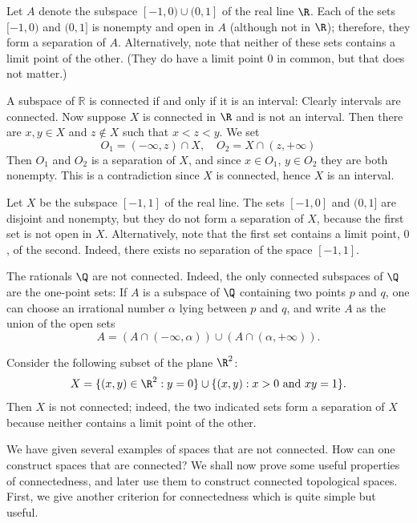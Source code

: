 \begin{example}
Let $A$ denote the subspace $[-1,0)\cup(0,1]$ of the real line $\R$. Each of the sets $[-1,0)$ and $(0,1]$ is nonempty and open in $A$ (although not in $\R$); therefore, they form a separation of $A$. Alternatively, note that neither of these sets contains a limit point of the other. (They do have a limit point $0$ in common, but that does not matter.)
\end{example}
\begin{example}
A subspace of $\mathbb{R}$ is connected if and only if it is an interval: Clearly intervals are connected. Now suppose $X$ is connected in $\R$ and is not an interval. Then there are $x,y\in X$ and $z\notin X$ such that $x<z<y$. We set
\[O_1=(-\infty,z)\cap X,\quad O_2=X\cap(z,+\infty)\]
Then $O_1$ and $O_2$ is a separation of $X$, and since $x\in O_1$, $y\in O_2$ they are both nonempty. This is a contradiction since $X$ is connected, hence $X$ is an interval.
\end{example}
\begin{example}
Let $X$ be the subspace $[-1,1]$ of the real line. The sets $[-1,0]$ and $(0,1]$ are disjoint and nonempty, but they do not form a separation of $X$, because the first set is not open in $X$. Alternatively, note that the first set contains a limit point, $0$, of the second. Indeed, there exists no separation of the space $[-1,1]$.
\end{example}
\begin{example}
The rationals $\Q$ are not connected. Indeed, the only connected subspaces of $\Q$ are the one-point sets: If $A$ is a subspace of $\Q$ containing two points $p$ and $q$, one can choose an irrational number $\alpha$ lying between $p$ and $q$, and write $A$ as the union of the open sets
\[A=(A\cap(-\infty,\alpha))\cup(A\cap(\alpha,+\infty)).\]
\end{example}
\begin{example}
Consider the following subset of the plane $\R^2$:
\[X=\{(x,y)\in\R^2:y=0\}\cup\{(x,y):\text{$x>0$ and $xy=1$}\}.\]
Then $X$ is not connected; indeed, the two indicated sets form a separation of $X$ because neither contains a limit point of the other.
\end{example}
We have given several examples of spaces that are not connected. How can one construct spaces that are connected? We shall now prove some useful properties of connectedness, and later use them to construct connected topological spaces. First, we give another criterion for connectedness which is quite simple but useful.
